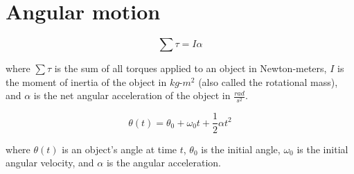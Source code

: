\section{Angular motion}

\begin{equation*}
  \sum \tau = I\alpha
\end{equation*}

where $\sum \tau$ is the sum of all torques applied to an object in
Newton-meters, $I$ is the moment of inertia of the object in $kg\mbox{-}m^2$
(also called the rotational mass), and $\alpha$ is the net angular acceleration
of the object in $\frac{rad}{s^2}$.

\begin{equation*}
  \theta(t) = \theta_0 + \omega_0 t + \frac{1}{2}\alpha t^2
\end{equation*}

where $\theta(t)$ is an object's angle at time $t$, $\theta_0$ is the initial
angle, $\omega_0$ is the initial angular velocity, and $\alpha$ is the angular
acceleration.
